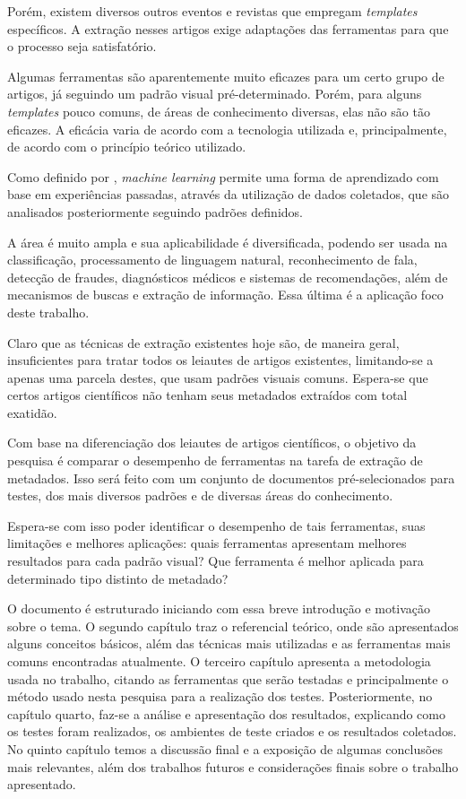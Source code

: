 Porém, existem diversos outros eventos e revistas que empregam \textit{templates} específicos. A extração nesses artigos exige adaptações das ferramentas para que o processo seja satisfatório.

Algumas ferramentas são aparentemente muito eficazes para um certo grupo de artigos, já seguindo um padrão visual pré-determinado. Porém, para alguns \textit{templates} pouco comuns, de áreas de conhecimento diversas, elas não são tão eficazes. A eficácia varia de acordo com a tecnologia utilizada e, principalmente, de acordo com o princípio teórico utilizado.

Como definido por \cite{foundations-machine-learning}, \textit{machine learning} permite uma forma de aprendizado com base em experiências passadas, através da utilização de dados coletados, que são analisados posteriormente seguindo padrões definidos.

A área é muito ampla e sua aplicabilidade é diversificada, podendo ser usada na classificação, processamento de linguagem natural, reconhecimento de fala, detecção de fraudes, diagnósticos médicos e sistemas de recomendações, além de mecanismos de buscas e extração de informação. Essa última é a aplicação foco deste trabalho.

Claro que as técnicas de extração existentes hoje são, de maneira geral, insuficientes para tratar todos os leiautes de artigos existentes, limitando-se a apenas uma parcela destes, que usam padrões visuais comuns. Espera-se que certos artigos científicos não tenham seus metadados extraídos com total exatidão.

Com base na diferenciação dos leiautes de artigos científicos, o objetivo da pesquisa é comparar o desempenho de ferramentas na tarefa de extração de metadados. Isso será feito com um conjunto de documentos pré-selecionados para testes, dos mais diversos padrões e de diversas áreas do conhecimento.

Espera-se com isso poder identificar o desempenho de tais ferramentas, suas limitações e melhores aplicações: quais ferramentas apresentam melhores resultados para cada padrão visual? Que ferramenta é melhor aplicada para determinado tipo distinto de metadado?

O documento é estruturado iniciando com essa breve introdução e motivação sobre o tema. O segundo capítulo traz o referencial teórico, onde são apresentados alguns conceitos básicos, além das técnicas mais utilizadas e as ferramentas mais comuns encontradas atualmente. O terceiro capítulo apresenta a metodologia usada no trabalho, citando as ferramentas que serão testadas e principalmente o método usado nesta pesquisa para a realização dos testes. Posteriormente, no capítulo quarto, faz-se a análise e apresentação dos resultados, explicando como os testes foram realizados, os ambientes de teste criados e os resultados coletados. No quinto capítulo temos a discussão final e a exposição de algumas conclusões mais relevantes, além dos trabalhos futuros e considerações finais sobre o trabalho apresentado.

